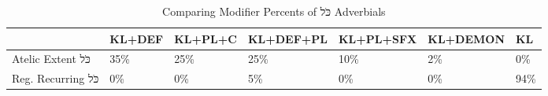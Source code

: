 \begin{table}[htbp!]
\centering
\caption{Comparing Modifier Percents of כֹּל Adverbials}
\label{table:kl_cf_pc}
\begin{adjustbox}{width=1\textwidth}
\begin{tabular}{lllllll}
\toprule
{} & KL+DEF & KL+PL+C & KL+DEF+PL & KL+PL+SFX & KL+DEMON &   KL \\
\midrule
Atelic Extent כֹּל  &    35\% &     25\% &       25\% &       10\% &       2\% &   0\% \\
Reg. Recurring כֹּל &     0\% &      0\% &        5\% &        0\% &       0\% &  94\% \\
\bottomrule
\end{tabular}
\end{adjustbox}
\end{table}

